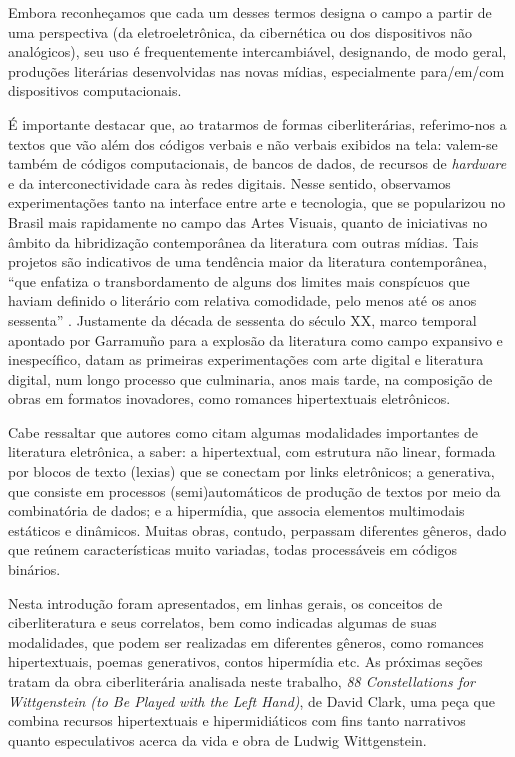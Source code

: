 \documentclass[portuguese]{textolivre}
\begin{document}
Embora reconheçamos que cada um desses termos designa o campo a partir de uma perspectiva (da eletroeletrônica, da cibernética ou dos dispositivos não analógicos), seu uso é frequentemente intercambiável, designando, de modo geral, produções literárias desenvolvidas nas novas mídias, especialmente para/em/com dispositivos computacionais.

É importante destacar que, ao tratarmos de formas ciberliterárias, referimo-nos a textos que vão além dos códigos verbais e não verbais exibidos na tela: valem-se também de códigos computacionais, de bancos de dados, de recursos de \emph{hardware} e da interconectividade cara às redes digitais. Nesse sentido, observamos experimentações tanto na interface entre arte e tecnologia, que se popularizou no Brasil mais rapidamente no campo das Artes Visuais, quanto de iniciativas no âmbito da hibridização contemporânea da literatura com outras mídias. Tais projetos são indicativos de uma tendência maior da literatura contemporânea, “que enfatiza o transbordamento de alguns dos limites mais conspícuos que haviam definido o literário com relativa comodidade, pelo menos até os anos sessenta” \cite[p. 1]{garramuno2009}. Justamente da década de sessenta do século XX, marco temporal apontado por Garramuño para a explosão da literatura como campo expansivo e inespecífico, datam as primeiras experimentações com arte digital e literatura digital, num longo processo que culminaria, anos mais tarde, na composição de obras em formatos inovadores, como romances hipertextuais eletrônicos.

Cabe ressaltar que autores como \textcite{rettberg2019, funkhouser2012} citam algumas modalidades importantes de literatura eletrônica, a saber: a hipertextual, com estrutura não linear, formada por blocos de texto (lexias) que se conectam por links eletrônicos; a generativa, que consiste em processos (semi)automáticos de produção de textos por meio da combinatória de dados; e a hipermídia, que associa elementos multimodais estáticos e dinâmicos. Muitas obras, contudo, perpassam diferentes gêneros, dado que reúnem características muito variadas, todas processáveis em códigos binários.

Nesta introdução foram apresentados, em linhas gerais, os conceitos de ciberliteratura e seus correlatos, bem como indicadas algumas de suas modalidades, que podem ser realizadas em diferentes gêneros, como romances hipertextuais, poemas generativos, contos hipermídia etc. As próximas seções tratam da obra ciberliterária analisada neste trabalho, \emph{88 Constellations for Wittgenstein (to Be Played with the Left Hand)}, de David Clark, uma peça que combina recursos hipertextuais e hipermidiáticos com fins tanto narrativos quanto especulativos acerca da vida e obra de Ludwig Wittgenstein.
\end{document}
